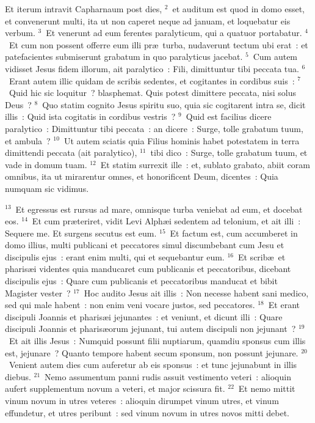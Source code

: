 \lettrine[lines=3,image=true,loversize=0.05,lraise=-0.03]{E}{}t iterum intravit Capharnaum post dies,
${}^{2}$~et auditum est quod in domo esset, et convenerunt multi, ita ut non caperet neque ad januam, et loquebatur eis verbum.
${}^{3}$~Et venerunt ad eum ferentes paralyticum, qui a quatuor portabatur.
${}^{4}$~Et cum non possent offerre eum illi pr\ae\ turba, nudaverunt tectum ubi erat~: et patefacientes submiserunt grabatum in quo paralyticus jacebat.
${}^{5}$~Cum autem vidisset Jesus fidem illorum, ait paralytico~: Fili, dimittuntur tibi peccata tua.
${}^{6}$~Erant autem illic quidam de scribis sedentes, et cogitantes in cordibus suis~:
${}^{7}$~Quid hic sic loquitur~? blasphemat. Quis potest dimittere peccata, nisi solus Deus~?
${}^{8}$~Quo statim cognito Jesus spiritu suo, quia sic cogitarent intra se, dicit illis~: Quid ista cogitatis in cordibus vestris~?
${}^{9}$~Quid est facilius dicere paralytico~: Dimittuntur tibi peccata~: an dicere~: Surge, tolle grabatum tuum, et ambula~?
${}^{10}$~Ut autem sciatis quia Filius hominis habet potestatem in terra dimittendi peccata (ait paralytico),
${}^{11}$~tibi dico~: Surge, tolle grabatum tuum, et vade in domum tuam.
${}^{12}$~Et statim surrexit ille~: et, sublato grabato, abiit coram omnibus, ita ut mirarentur omnes, et honorificent Deum, dicentes~: Quia numquam sic vidimus.


${}^{13}$~Et egressus est rursus ad mare, omnisque turba veniebat ad eum, et docebat eos.
${}^{14}$~Et cum pr\ae teriret, vidit Levi Alph\ae i sedentem ad telonium, et ait illi~: Sequere me. Et surgens secutus est eum.
${}^{15}$~Et factum est, cum accumberet in domo illius, multi publicani et peccatores simul discumbebant cum Jesu et discipulis ejus~: erant enim multi, qui et sequebantur eum.
${}^{16}$~Et scrib\ae\ et pharis\ae i videntes quia manducaret cum publicanis et peccatoribus, dicebant discipulis ejus~: Quare cum publicanis et peccatoribus manducat et bibit Magister vester~?
${}^{17}$~Hoc audito Jesus ait illis~: Non necesse habent sani medico, sed qui male habent~: non enim veni vocare justos, sed peccatores.
${}^{18}$~Et erant discipuli Joannis et pharis\ae i jejunantes~: et veniunt, et dicunt illi~: Quare discipuli Joannis et pharis\ae orum jejunant, tui autem discipuli non jejunant~?
${}^{19}$~Et ait illis Jesus~: Numquid possunt filii nuptiarum, quamdiu sponsus cum illis est, jejunare~? Quanto tempore habent secum sponsum, non possunt jejunare.
${}^{20}$~Venient autem dies cum auferetur ab eis sponsus~: et tunc jejunabunt in illis diebus.
${}^{21}$~Nemo assumentum panni rudis assuit vestimento veteri~: alioquin aufert supplementum novum a veteri, et major scissura fit.
${}^{22}$~Et nemo mittit vinum novum in utres veteres~: alioquin dirumpet vinum utres, et vinum effundetur, et utres peribunt~: sed vinum novum in utres novos mitti debet.


